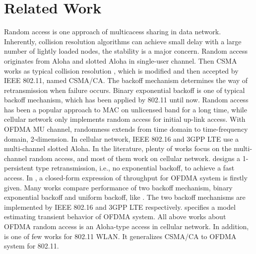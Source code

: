 \section{Related Work}
Random access is one approach of multicacess sharing in data network.
Inherently, collision resolution algorithms can achieve small delay with a large number of lightly loaded nodes, the stability is a major concern\cite{bertsekas1992data}\cite{chen1994medium}.  
Random access originates from Aloha and slotted Aloha in single-user channel. 
Then CSMA works as typical collision resolution  \cite{kleinrock1975packet}, which is modified and then accepted by IEEE 802.11, named CSMA/CA. 
The backoff mechanism determines the way of retransmission when failure occurs. 
Binary exponential backoff is one of typical backoff mechanism, which has been applied by 802.11 until now.
Random access has been a popular approach to MAC on unlicensed band for a long time, while cellular network  only implements random access for initial up-link access. 
With OFDMA MU channel, randomness extends from time domain to time-frequency domain, 2-dimension. 
In cellular network, IEEE 802.16 and 3GPP LTE use a multi-channel slotted Aloha.
In the literature, plenty of works focus on the multi-channel random access, and most of them work on cellular network.
\cite{choi2006multichannel} designs a 1-persistent type retransmission, i.e., no exponential backoff, to achieve a fast access.  
In \cite{zhou2008efficient}, a closed-form expression of throughput for OFDMA system is firstly given.
Many works compare performance of two backoff mechanism, binary exponential backoff and uniform backoff, like \cite{zhou2008efficient} \cite{seo2011design} \cite{kim2012performance}.
The two backoff mechanisms are implemented by IEEE 802.16 and 3GPP LTE respectively.  \cite{wei2015modeling} specifies a model estimating transient behavior of OFDMA system.
All above works about OFDMA random access is an Aloha-type access in cellular network.
In addition, \cite{GeneralizedOFDMACSMACA} is one of few works for 802.11 WLAN. 
It generalizes CSMA/CA to OFDMA system for 802.11.

